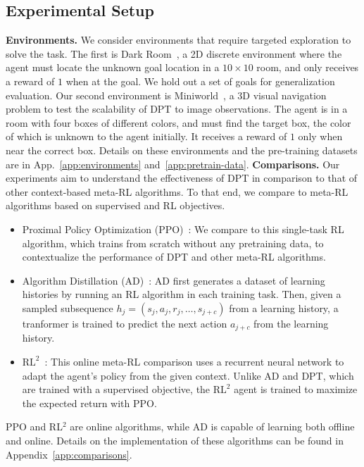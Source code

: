 \documentclass{article}
\begin{document}
\subsection{Experimental Setup}
\textbf{Environments. } We consider environments that require targeted exploration to solve the task. The first is Dark Room~\citep{zintgraf2019varibad,laskin2022context}, a 2D discrete environment where the agent must locate the unknown goal location in a $10 \times 10$ room,
and only receives a reward of $1$ when at the goal. We hold out a set of goals for generalization evaluation.
Our second environment is Miniworld~\citep{chevalier2018miniworld}, a 3D visual navigation problem to test the scalability of DPT to image observations. The agent is in a room with four boxes of different colors, and must find the target box, the color of which is unknown to the agent initially. It receives a reward of $1$ only when near the correct box.
Details on these environments and the pre-training datasets
are in App.~\ref{app:environments} and~\ref{app:pretrain-data}.
\textbf{Comparisons.} Our experiments aim to understand the effectiveness of DPT in comparison to that of other context-based meta-RL algorithms. To that end, we compare to meta-RL algorithms based on supervised and RL objectives.
\begin{itemize}[leftmargin=1em,noitemsep]
    \item Proximal Policy Optimization (PPO)~\citep{schulman2017proximal}: We compare to this single-task RL algorithm, which trains from scratch without any pretraining data, to contextualize the performance of DPT and other meta-RL algorithms.
    \item Algorithm Distillation (AD)~\citep{laskin2022context}: AD first generates a dataset of learning histories by running an RL algorithm in each training task.
    Then, given a sampled
    subsequence $h_j = (s_j, a_j, r_j, \dots, s_{j+c})$ from a learning history, a tranformer is trained to predict the next action $a_{j+c}$ from the learning history.
    \item $\text{RL}^2$~\citep{duan2016rl}: This online meta-RL comparison uses a recurrent neural network to adapt the agent's policy from the given context. Unlike AD and DPT, which are trained with a supervised objective, the $\text{RL}^2$ agent is trained to maximize the expected return with PPO.
\end{itemize}
PPO and RL$^2$ are online algorithms, while AD is capable of learning both offline and online. Details on the implementation of these algorithms can be found in Appendix~\ref{app:comparisons}.
\end{document}

